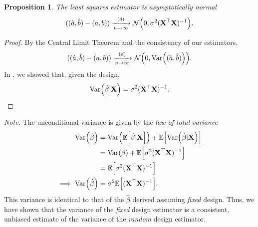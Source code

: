 \documentclass[letterpaper, reqno]{amsart}
\newtheorem{prop}{Proposition}[section]
\numberwithin{equation}{section}
\newcommand{\T}{\top} %
\newcommand{\vect}[1]{\boldsymbol{\mathbf{#1}}} %
\newcommand{\E}[1]{\mathbb{E}\mleft[#1\mright]}
\newcommand{\Var}[1]{\operatorname{Var}\mleft(#1\mright)}
\newcommand{\N}[2]{\mathcal{N}\mleft( #1, #2 \mright)}
\newcommand{\Dlim}{\xrightarrow[n \to \infty]{(d)}}
\newcommand{\Xm}{\vect{X}}
\newcommand{\Bv}{\beta}
\newcommand{\Bvh}{\hat{\beta}}
\begin{document}
\begin{prop}
  The least squares estimator is asymptotically normal
  \[ ((\hat{a}, \hat{b}) - (a, b)) \Dlim \N{0}{\sigma^2 (\Xm^\T\Xm)^{-1}}. \]
\end{prop}

\begin{proof}
  By the Central Limit Theorem and the consistency of our estimators,
  \[ ((\hat{a}, \hat{b}) - (a, b)) \Dlim \N{0}{\Var{(\hat{a}, \hat{b})}}. \]
  In , we showed that, given the design,
  \[ \Var{\Bvh|\Xm} = \sigma^2 (\Xm^\T\Xm)^{-1}. \qedhere \]
\end{proof}

\begin{tcolorbox}
  \emph{Note.}
  The unconditional variance is given by the \emph{law of total variance}
  \begin{align*}
    \Var{\Bvh} &= \Var{\E{\Bvh|\Xm}} + \E{\Var{\Bvh|\Xm}} \\
              &= \Var{\Bv} + \E{\sigma^2 (\Xm^\T\Xm)^{-1}} \\
              &= \E{\sigma^2 (\Xm^\T\Xm)^{-1}} \\
    \implies \Var{\Bvh} &= \sigma^2 \E{(\Xm^\T\Xm)^{-1}}.
  \end{align*}
  This variance is identical to that of the $\Bvh$ derived assuming \emph{fixed}
  design. Thus, we have shown that the variance of the \emph{fixed} design
  estimator is a consistent, unbiased estimate of the variance of the
  \emph{random} design estimator.
\end{tcolorbox}
\end{document}

